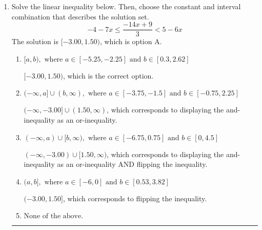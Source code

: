 \documentclass{extbook}[14pt]
\newcommand{\litem}[1]{\item #1

\rule{\textwidth}{0.4pt}}
\begin{document}
\begin{enumerate}
{\begin{enumerate}[label=\Alph*.]
Corresponds to including the endpoints AND negating.
\item \( (-\infty, a] \cup [b, \infty), \text{ where } a \in [-10.5, -3] \text{ and } b \in [-6, -1.5] \)

Corresponds to including the endpoints (when they should be excluded).
\item \( (-\infty, a) \cup (b, \infty), \text{ where } a \in [0, 4.5] \text{ and } b \in [5.25, 9.75] \)

Corresponds to inverting the inequality and negating the solution.
\item \( (-\infty, a) \cup (b, \infty), \text{ where } a \in [-8.25, -6] \text{ and } b \in [-8.25, -3] \)

 * Correct option.
\item \( (-\infty, \infty) \)

Corresponds to the variable canceling, which does not happen in this instance.
\end{enumerate}

\textbf{General Comment:} When multiplying or dividing by a negative, flip the sign.
}
\litem{
Solve the linear inequality below. Then, choose the constant and interval combination that describes the solution set.
\[ -4 - 7 x \leq \frac{-14 x + 9}{3} < 5 - 6 x \]The solution is \( [-3.00, 1.50) \), which is option A.\begin{enumerate}[label=\Alph*.]
\item \( [a, b), \text{ where } a \in [-5.25, -2.25] \text{ and } b \in [0.3, 2.62] \)

$[-3.00, 1.50)$, which is the correct option.
\item \( (-\infty, a] \cup (b, \infty), \text{ where } a \in [-3.75, -1.5] \text{ and } b \in [-0.75, 2.25] \)

$(-\infty, -3.00] \cup (1.50, \infty)$, which corresponds to displaying the and-inequality as an or-inequality.
\item \( (-\infty, a) \cup [b, \infty), \text{ where } a \in [-6.75, 0.75] \text{ and } b \in [0, 4.5] \)

$(-\infty, -3.00) \cup [1.50, \infty)$, which corresponds to displaying the and-inequality as an or-inequality AND flipping the inequality.
\item \( (a, b], \text{ where } a \in [-6, 0] \text{ and } b \in [0.53, 3.82] \)

$(-3.00, 1.50]$, which corresponds to flipping the inequality.
\item \( \text{None of the above.} \)



\end{enumerate}}
\end{enumerate}
\end{document}
